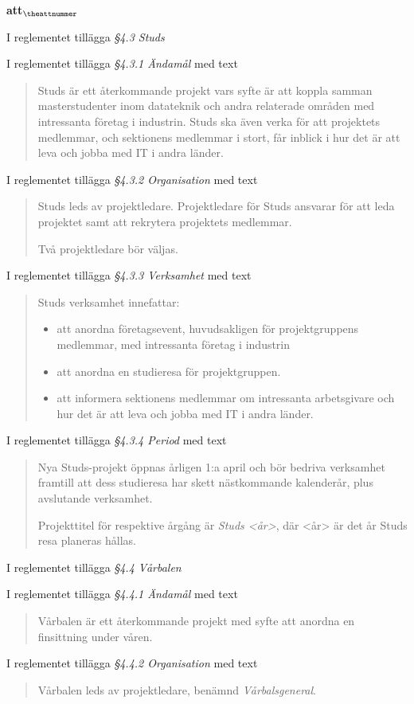 \documentclass[a4paper]{article}
\begin{document}
\begin{list}{\bf att$_{\theattnummer}$}{}
\item I reglementet tillägga \textit{\S4.3 Studs}
\item I reglementet tillägga \textit{\S4.3.1 Ändamål} med text
    \begin{quote}
        Studs är ett återkommande projekt vars syfte är att koppla samman masterstudenter inom datateknik och andra relaterade områden med intressanta företag i industrin. Studs ska även verka för att projektets medlemmar, och sektionens medlemmar i stort, får inblick i hur det är att leva och jobba med IT i andra länder.
    \end{quote}
\item I reglementet tillägga \textit{\S4.3.2 Organisation} med text
    \begin{quote}
        Studs leds av projektledare. Projektledare för Studs
        ansvarar för att leda projektet samt att rekrytera projektets medlemmar.

        Två projektledare bör väljas.
    \end{quote}
\item I reglementet tillägga \textit{\S4.3.3 Verksamhet} med text
    \begin{quote}
        Studs verksamhet innefattar:
        \begin{itemize}
            \item att anordna företagsevent, huvudsakligen för projektgruppens medlemmar, med intressanta företag i industrin
            \item att anordna en studieresa för projektgruppen.
            \item att informera sektionens medlemmar om intressanta arbetsgivare och hur det är att leva och jobba med IT i andra länder.
        \end{itemize}
    \end{quote}
\item I reglementet tillägga \textit{\S4.3.4 Period} med text
    \begin{quote}
        Nya Studs-projekt öppnas årligen 1:a april och bör bedriva verksamhet framtill att dess studieresa har skett nästkommande kalenderår, plus avslutande verksamhet.

        Projekttitel för respektive årgång är \textit{Studs <år>}, där <år> är det år Studs resa planeras hållas.
    \end{quote}


\item I reglementet tillägga \textit{\S4.4 Vårbalen}
\item I reglementet tillägga \textit{\S4.4.1 Ändamål} med text
    \begin{quote}
        Vårbalen är ett återkommande projekt med syfte att anordna en finsittning under våren.
    \end{quote}
\item I reglementet tillägga \textit{\S4.4.2 Organisation} med text
    \begin{quote}
        Vårbalen leds av projektledare, benämnd \textit{Vårbalsgeneral}.


\end{quote}
\end{list}
\end{document}
